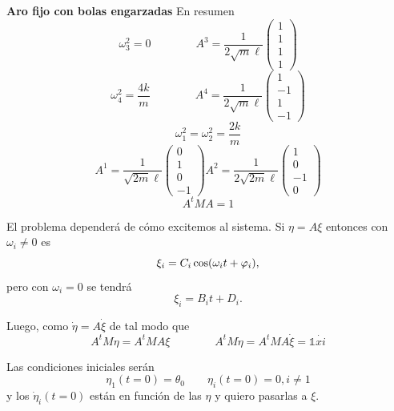 \documentclass[10pt,oneside]{CBFT_book}
\begin{document}
\begin{ejemplo}{\bf Aro fijo con bolas engarzadas}
En resumen 
\[
	\omega_3^2 = 0 \qquad \qquad A^3 = \frac{1}{2\sqrt{m}\ell}
						\begin{pmatrix} 1 \\ 1 \\ 1 \\ 1 \end{pmatrix}
\]
\[
	\omega_4^2 = \frac{4k}{m} \qquad \qquad A^4 = \frac{1}{2\sqrt{m}\ell}
						\begin{pmatrix} 1 \\ -1 \\ 1 \\ -1 \end{pmatrix}
\]
\[
	\omega_1^2 = \omega_2^2 = \frac{2k}{m}
\]
\[
	A^1 = \frac{1}{\sqrt{2m}\ell}
		\begin{pmatrix} 0 \\ 1 \\ 0 \\ -1 \end{pmatrix}
	A^2 = \frac{1}{2\sqrt{2m}\ell}
		\begin{pmatrix} 1 \\ 0 \\ -1 \\ 0 \end{pmatrix}
\]
\[
	A^t M A = 1
\]

El problema dependerá de cómo excitemos al sistema. Si $\eta = A \xi $ entonces con $\omega_i \neq 0$ es
\[
	\xi_i = C_i \cos (\omega_i t + \varphi_i),
\]
pero con $\omega_i = 0$ se tendrá
\[
	\xi_i = B_i t + D_i.
\]

Luego, como $\dot{\eta} = A \dot{\xi} $ de tal modo que 
\[
	A^t M \eta = A^t M A \xi \qquad \qquad  A^t M \dot{\eta} = A^t M A \dot{\xi} = \mathbb{1} \dot{xi}
\]

Las condiciones iniciales serán 
\[
	\eta_1(t=0) = \theta_0 \qquad \eta_i(t=0) = 0, i \neq 1 
\]
y los $\dot{\eta}_i(t=0)$ están en función de las $\eta$ y quiero pasarlas a $\xi$.


\end{ejemplo}
\end{document}
